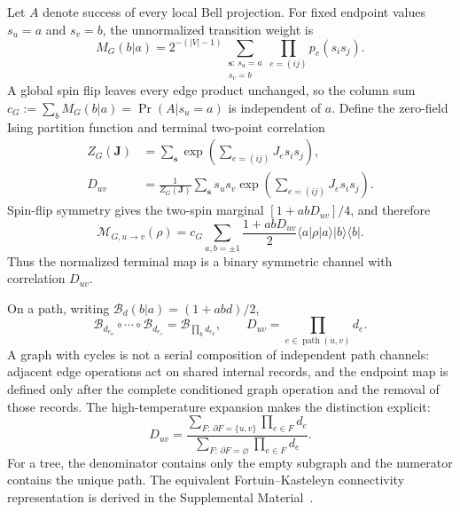 \documentclass[aps,prl,reprint,amsmath,amssymb,superscriptaddress,nofootinbib,floatfix]{revtex4-2}
\newcommand{\Prb}{\operatorname{Pr}}
\newcommand{\Mmap}{\mathcal{M}}
\begin{document}
Let $A$ denote success of every local Bell projection. For fixed endpoint values $s_u=a$ and $s_v=b$, the unnormalized transition weight is
\begin{equation}
 M_G(b|a)=2^{-(|V|-1)}\sum_{\substack{\bm s:\,s_u=a\\s_v=b}}\prod_{e=(ij)}p_e(s_is_j).
\label{eq:terminalM}
\end{equation}
A global spin flip leaves every edge product unchanged, so the column sum $c_G:=\sum_bM_G(b|a)=\Prb(A|s_u=a)$ is independent of $a$. Define the zero-field Ising partition function and terminal two-point correlation
\begin{align}
 Z_G(\bm J)&=\sum_{\bm s}\exp\!\left(\sum_{e=(ij)}J_es_is_j\right),\nonumber\\
 D_{uv}&=\frac{1}{Z_G(\bm J)}\sum_{\bm s}s_us_v\exp\!\left(\sum_{e=(ij)}J_es_is_j\right).
\label{eq:Dcorr}
\end{align}
Spin-flip symmetry gives the two-spin marginal $[1+abD_{uv}]/4$, and therefore
\begin{equation}
 \Mmap_{G,u\to v}(\rho)=c_G\sum_{a,b=\pm1}\frac{1+abD_{uv}}{2}\langle a|\rho|a\rangle |b\rangle\!\langle b|.
\label{eq:map}
\end{equation}
Thus the normalized terminal map is a binary symmetric channel with correlation $D_{uv}$.

On a path, writing $\mathcal B_d(b|a)=(1+abd)/2$,
\begin{equation}
 \mathcal B_{d_{e_n}}\circ\cdots\circ\mathcal B_{d_{e_1}}=\mathcal B_{\prod_kd_{e_k}},\qquad D_{uv}=\prod_{e\in\operatorname{path}(u,v)}d_e.
\label{eq:serialcomposition}
\end{equation}
A graph with cycles is not a serial composition of independent path channels: adjacent edge operations act on shared internal records, and the endpoint map is defined only after the complete conditioned graph operation and the removal of those records. The high-temperature expansion makes the distinction explicit:
\begin{equation}
 D_{uv}=\frac{\displaystyle\sum_{F:\,\partial F=\{u,v\}}\prod_{e\in F}d_e}{\displaystyle\sum_{F:\,\partial F=\varnothing}\prod_{e\in F}d_e}.
\label{eq:strings}
\end{equation}
For a tree, the denominator contains only the empty subgraph and the numerator contains the unique path. The equivalent Fortuin--Kasteleyn connectivity representation is derived in the Supplemental Material~\cite{SM,FortuinKasteleyn1972,EdwardsSokal1988}.
\end{document}
